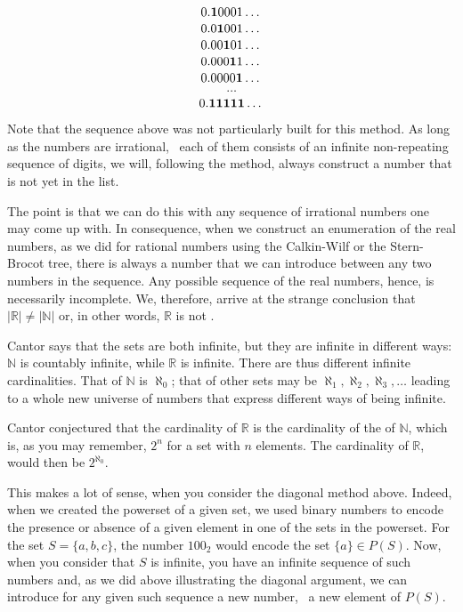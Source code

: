 \documentclass[tikz]{scrreprt}
\begin{document}
\begin{minipage}{\textwidth}
\[
0.\mathbf{1}0001\dots\\
\]
\[
0.0\mathbf{1}001\dots\\
\]
\[
0.00\mathbf{1}01\dots\\
\]
\[
0.000\mathbf{1}1\dots\\
\]
\[
0.0000\mathbf{1}\dots\\
\]
\[
\dots
\]
\[
0.\mathbf{11111}\dots\\
\]
\end{minipage}

Note that the sequence above was not particularly
built for this method. As long as the numbers are
irrational, \ie\ each of them consists of an infinite 
non-repeating sequence of digits, we will, 
following the method, always construct a number
that is not yet in the list.

The point is that we can do this with any sequence
of irrational numbers one may come up with.
In consequence, when we construct an enumeration 
of the real numbers, as we did for rational
numbers using the Calkin-Wilf or the Stern-Brocot tree,
there is always a number that we can introduce
between any two numbers in the sequence.
Any possible sequence of the real numbers, hence,
is necessarily incomplete.
We, therefore, arrive at the strange conclusion
that $|\mathbb{R}|\neq|\mathbb{N}|$ or,
in other words, $\mathbb{R}$ is not .

Cantor says that the sets are both infinite,
but they are infinite in different ways:
$\mathbb{N}$ is countably infinite, while
$\mathbb{R}$ is  infinite.
There are thus different infinite cardinalities.
That of $\mathbb{N}$ is $\aleph_0$;
that of other sets may be $\aleph_1, \aleph_2, \aleph_3,\dots$
leading to a whole new universe of numbers
that express different ways of being infinite.

Cantor conjectured that the cardinality of $\mathbb{R}$
is the cardinality of the  of $\mathbb{N}$,
which is, as you may remember, $2^n$ for a set with $n$
elements. The cardinality of $\mathbb{R}$, would then be
$2^{\aleph_0}$.

This makes a lot of sense, 
when you consider the diagonal method above.
Indeed, when we created the powerset of a given set,
we used binary numbers to encode the presence or absence
of a given element in one of the sets in the powerset.
For the set $S=\lbrace a,b,c\rbrace$, the number $100_2$
would encode the set $\lbrace a\rbrace \in P(S)$.
Now, when you consider that $S$ is infinite,
you have an infinite sequence of such numbers and,
as we did above illustrating the diagonal argument,
we can introduce for any given such sequence
a new number, \ie\ a new element of $P(S)$.
\end{document}
